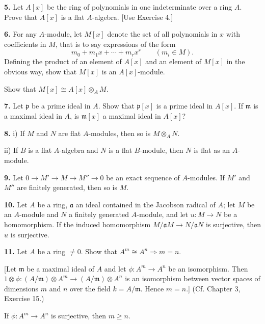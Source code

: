 
\noindent\textbf{5.} Let $A[x]$ be the ring of polynomials in one indeterminate over a ring $A$.  Prove
that $A[x]$ is a flat $A$-algebra.  [Use Exercise 4.]

\medskip
\noindent\textbf{6.} For any $A$-module, let $M[x]$ denote the set of all polynomials in $x$ with coefficients in $M$, that is to say expressions of the form
\[
m_0+m_1x+\cdots+m_rx^r\qquad(m_i\in M).
\]
Defining the product of an element of $A[x]$ and an element of $M[x]$ in the obvious
way, show that $M[x]$ is an $A[x]$-module.

Show that $M[x]\cong A[x]\otimes_A M$.

\medskip
\noindent\textbf{7.} Let $\mathfrak p$ be a prime ideal in $A$.  Show that $\mathfrak p[x]$ is a prime ideal in $A[x]$.  If $\mathfrak m$ is a
maximal ideal in $A$, is $\mathfrak m[x]$ a maximal ideal in $A[x]$?

\medskip
\noindent\textbf{8.} i) If $M$ and $N$ are flat $A$-modules, then so is $M\otimes_A N$.

ii) If $B$ is a flat $A$-algebra and $N$ is a flat $B$-module, then $N$ is flat as an $A$-module.

\medskip
\noindent\textbf{9.} Let $0\longrightarrow M'\longrightarrow M\longrightarrow M''\longrightarrow0$ be an exact sequence of $A$-modules.  If $M'$ and
$M''$ are finitely generated, then so is $M$.

\medskip
\noindent\textbf{10.} Let $A$ be a ring, $\mathfrak a$ an ideal contained in the Jacobson radical of $A$; let $M$ be an
$A$-module and $N$ a finitely generated $A$-module, and let $u:M\longrightarrow N$ be a homomorphism.  If the induced homomorphism $M/\mathfrak aM\longrightarrow N/\mathfrak aN$ is surjective, then
$u$ is surjective.

\medskip
\noindent\textbf{11.} Let $A$ be a ring $\ne0$.  Show that $A^m\cong A^n\Rightarrow m=n$.

[Let $\mathfrak m$ be a maximal ideal of $A$ and let $\phi:A^m\longrightarrow A^n$ be an isomorphism.  Then
$1\otimes\phi:(A/\mathfrak m)\otimes A^m\longrightarrow(A/\mathfrak m)\otimes A^n$ is an isomorphism between vector spaces
of dimensions $m$ and $n$ over the field $k=A/\mathfrak m$.  Hence $m=n$.] (Cf. Chapter 3,
Exercise 15.)

If $\phi:A^m\longrightarrow A^n$ is surjective, then $m\geq n$.


